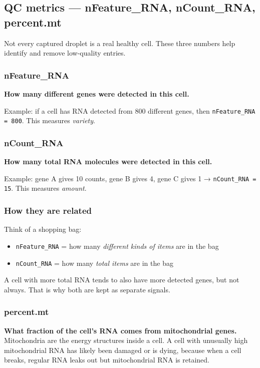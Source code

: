 \documentclass[11pt, a4paper]{article}
\begin{document}
\subsection{QC metrics — nFeature\_RNA, nCount\_RNA, percent.mt}

Not every captured droplet is a real healthy cell. These three numbers help identify
and remove low-quality entries.

\subsubsection{nFeature\_RNA}

\textbf{How many different genes were detected in this cell.}

Example: if a cell has RNA detected from 800 different genes, then \texttt{nFeature\_RNA = 800}.
This measures \textit{variety}.

\subsubsection{nCount\_RNA}

\textbf{How many total RNA molecules were detected in this cell.}

Example: gene A gives 10 counts, gene B gives 4, gene C gives 1 → \texttt{nCount\_RNA = 15}.
This measures \textit{amount}.

\subsubsection{How they are related}

Think of a shopping bag:
\begin{itemize}[nosep]
  \item \texttt{nFeature\_RNA} = how many \textit{different kinds of items} are in the bag
  \item \texttt{nCount\_RNA} = how many \textit{total items} are in the bag
\end{itemize}
A cell with more total RNA tends to also have more detected genes, but not always.
That is why both are kept as separate signals.

\subsubsection{percent.mt}

\textbf{What fraction of the cell's RNA comes from mitochondrial genes.}
Mitochondria are the energy structures inside a cell.
A cell with unusually high mitochondrial RNA has likely been damaged or is dying,
because when a cell breaks, regular RNA leaks out but mitochondrial RNA is retained.
\end{document}
